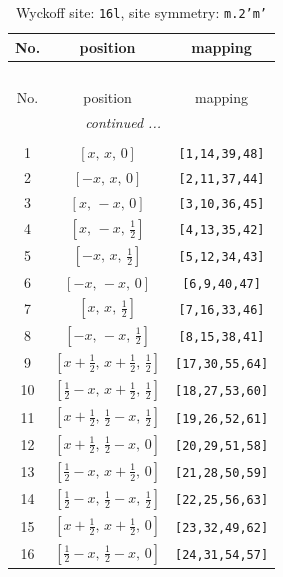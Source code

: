 \documentclass[fleqn,8pt]{jsarticle}
\begin{document}
\renewcommand{\arraystretch}{1.2}
\begin{longtable}{ccc}
\caption{Wyckoff site: {\tt 16l}, site symmetry: {\tt m.2'm'}}
 \\
 \hline \hline
No. & position & mapping \\ \hline \endfirsthead

\multicolumn{2}{l}{\tablename\ \thetable{}} \\
 \hline \hline
No. & position & mapping \\ \hline \endhead

 \hline \hline
\multicolumn{2}{r}{\footnotesize\it continued ...} \\ \endfoot

 \hline \hline
\multicolumn{2}{r}{} \\ \endlastfoot

1 & $\left[ x,\, x,\, 0 \right]$ & {\tt [1,14,39,48]} \\ \hline
2 & $\left[ - x,\, x,\, 0 \right]$ & {\tt [2,11,37,44]} \\ \hline
3 & $\left[ x,\, - x,\, 0 \right]$ & {\tt [3,10,36,45]} \\ \hline
4 & $\left[ x,\, - x,\, \frac{1}{2} \right]$ & {\tt [4,13,35,42]} \\ \hline
5 & $\left[ - x,\, x,\, \frac{1}{2} \right]$ & {\tt [5,12,34,43]} \\ \hline
6 & $\left[ - x,\, - x,\, 0 \right]$ & {\tt [6,9,40,47]} \\ \hline
7 & $\left[ x,\, x,\, \frac{1}{2} \right]$ & {\tt [7,16,33,46]} \\ \hline
8 & $\left[ - x,\, - x,\, \frac{1}{2} \right]$ & {\tt [8,15,38,41]} \\ \hline
9 & $\left[ x + \frac{1}{2},\, x + \frac{1}{2},\, \frac{1}{2} \right]$ & {\tt [17,30,55,64]} \\ \hline
10 & $\left[ \frac{1}{2} - x,\, x + \frac{1}{2},\, \frac{1}{2} \right]$ & {\tt [18,27,53,60]} \\ \hline
11 & $\left[ x + \frac{1}{2},\, \frac{1}{2} - x,\, \frac{1}{2} \right]$ & {\tt [19,26,52,61]} \\ \hline
12 & $\left[ x + \frac{1}{2},\, \frac{1}{2} - x,\, 0 \right]$ & {\tt [20,29,51,58]} \\ \hline
13 & $\left[ \frac{1}{2} - x,\, x + \frac{1}{2},\, 0 \right]$ & {\tt [21,28,50,59]} \\ \hline
14 & $\left[ \frac{1}{2} - x,\, \frac{1}{2} - x,\, \frac{1}{2} \right]$ & {\tt [22,25,56,63]} \\ \hline
15 & $\left[ x + \frac{1}{2},\, x + \frac{1}{2},\, 0 \right]$ & {\tt [23,32,49,62]} \\ \hline
16 & $\left[ \frac{1}{2} - x,\, \frac{1}{2} - x,\, 0 \right]$ & {\tt [24,31,54,57]} \\
\end{longtable}
\end{document}
